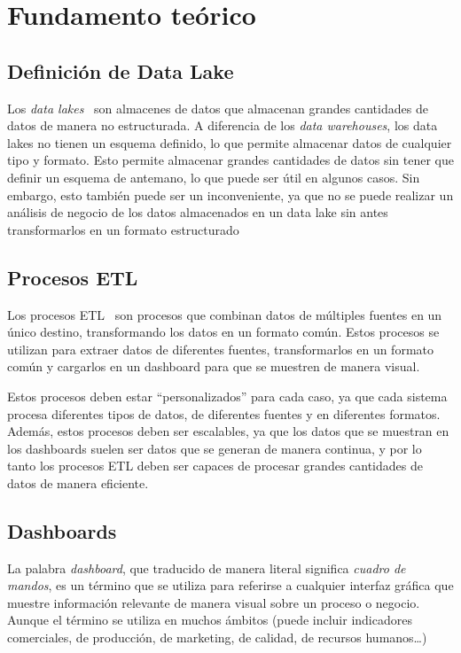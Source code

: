 \chapter{Fundamento teórico}\label{chap:teoria}
\section{Definición de Data Lake}\label{sec:datalake}
Los \textit{data lakes}~\cite{mier2023dashboards} son almacenes de datos que almacenan
grandes cantidades de datos de manera no estructurada. A diferencia de los \textit{data
warehouses}, los data lakes no tienen un esquema definido, lo que permite
almacenar datos de cualquier tipo y formato. Esto permite almacenar grandes
cantidades de datos sin tener que definir un esquema de antemano, lo que puede
ser útil en algunos casos. Sin embargo, esto también puede ser un inconveniente, ya
que no se puede realizar un análisis de negocio de los datos almacenados en un
data lake sin antes transformarlos en un formato estructurado

\section{Procesos ETL}\label{sec:etl}
Los procesos ETL~\cite{mier2023dashboards} son procesos que combinan datos de múltiples
fuentes en un único destino, transformando los datos en un formato común. Estos procesos
se utilizan para extraer datos de diferentes fuentes, transformarlos en un formato común
y cargarlos en un dashboard para que se muestren de manera visual.

Estos procesos deben estar “personalizados” para cada caso, ya que cada sistema
procesa diferentes tipos de datos, de diferentes fuentes y en diferentes formatos. Además,
estos procesos deben ser escalables, ya que los datos que se muestran en los dashboards
suelen ser datos que se generan de manera continua, y por lo tanto los procesos ETL deben
ser capaces de procesar grandes cantidades de datos de manera eficiente.

\section{Dashboards}\label{sec:dashboards}
La palabra \textit{dashboard}, que traducido de manera literal significa \textit{cuadro de mandos},
es un término que se utiliza para referirse a cualquier interfaz gráfica que muestre información
relevante de manera visual sobre un proceso o negocio. Aunque el término se utiliza en
muchos ámbitos (puede incluir indicadores comerciales, de producción, de marketing, de
calidad, de recursos humanos\ldots)

